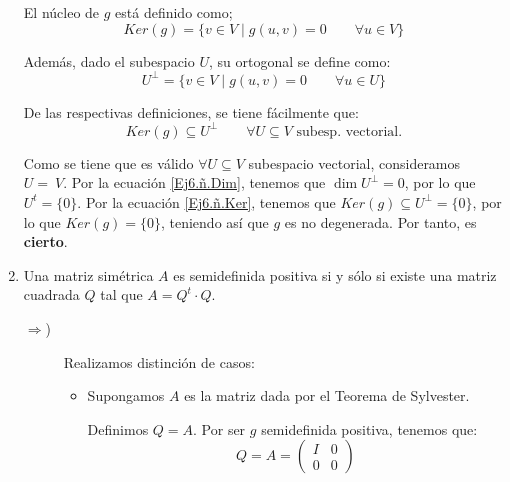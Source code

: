 \begin{ejercicio}
\begin{enumerate}
        El núcleo de $g$ está definido como;
        \begin{equation*}
            Ker(g)=\{v\in V \mid g(u,v)=0 \qquad \forall u\in V\}
        \end{equation*}

        Además, dado el subespacio $U$, su ortogonal se define como:
        \begin{equation*}
            U^\perp=\{v\in V \mid g(u,v)=0 \qquad \forall u\in U\}
        \end{equation*}

        De las respectivas definiciones, se tiene fácilmente que:
        \begin{equation} \label{Ej6.ñ.Ker}
            Ker(g)\subseteq U^\perp \qquad \forall U\subseteq V\text{ subesp. vectorial}.
        \end{equation}

        Como se tiene que es válido $\forall U\subseteq V$ subespacio vectorial, consideramos $U=~V$. Por la ecuación \ref{Ej6.ñ.Dim}, tenemos que $\dim U^\perp = 0$, por lo que $U^t=\{0\}$. Por la ecuación \ref{Ej6.ñ.Ker}, tenemos que $Ker(g)\subseteq U^\perp=\{0\}$, por lo que $Ker(g)=\{0\}$, teniendo así que $g$ es no degenerada. Por tanto, es \textbf{cierto}.

        \item Una matriz simétrica $A$ es semidefinida positiva si y sólo si existe una matriz cuadrada $Q$ tal que $A=Q^t\cdot Q$.

        \begin{description}
            \item [$\Longrightarrow$)] Realizamos distinción de casos:
            \begin{itemize}
                \item Supongamos $A$ es la matriz dada por el Teorema de Sylvester.
                
                Definimos $Q=A$. Por ser $g$ semidefinida positiva, tenemos que:
                \begin{equation*}
                    Q=A=\left(\begin{array}{c|c}
                        I & 0 \\ \hline
                        0 & 0
                    \end{array}\right)
                \end{equation*}
    

\end{itemize}
\end{description}
\end{enumerate}
\end{ejercicio}
